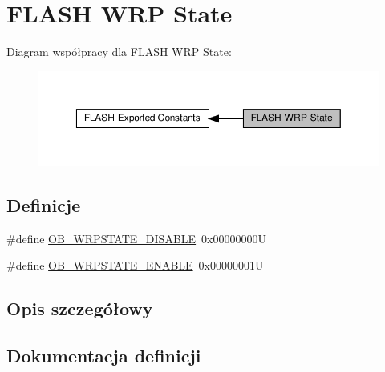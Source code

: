 \hypertarget{group___f_l_a_s_h_ex___w_r_p___state}{}\section{F\+L\+A\+SH W\+RP State}
\label{group___f_l_a_s_h_ex___w_r_p___state}
Diagram współpracy dla F\+L\+A\+SH W\+RP State\+:\nopagebreak
\begin{figure}[H]
\begin{center}
\leavevmode
\includegraphics[width=350pt]{group___f_l_a_s_h_ex___w_r_p___state}
\end{center}
\end{figure}
\subsection*{Definicje}
\begin{DoxyCompactItemize}
\item 
\#define \hyperlink{group___f_l_a_s_h_ex___w_r_p___state_gaa34eb6205fe554f65a311ee974d5a4ab}{O\+B\+\_\+\+W\+R\+P\+S\+T\+A\+T\+E\+\_\+\+D\+I\+S\+A\+B\+LE}~0x00000000U
\item 
\#define \hyperlink{group___f_l_a_s_h_ex___w_r_p___state_ga9fc463145ab57616baa36d95523186a1}{O\+B\+\_\+\+W\+R\+P\+S\+T\+A\+T\+E\+\_\+\+E\+N\+A\+B\+LE}~0x00000001U
\end{DoxyCompactItemize}


\subsection{Opis szczegółowy}


\subsection{Dokumentacja definicji}
\mbox{\label{group___f_l_a_s_h_ex___w_r_p___state_gaa34eb6205fe554f65a311ee974d5a4ab}} 
